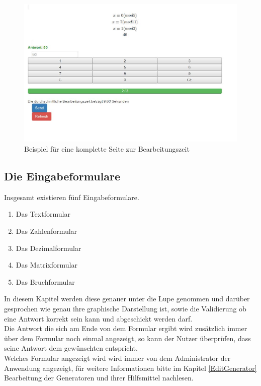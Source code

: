 \begin{figure}[htp]     %
\centering
\includegraphics[width=1\textwidth]{bilder/TotalClient} 
\caption[Beispiel für eine komplette Seite zur Bearbeitungszeit]{Beispiel für eine komplette Seite zur Bearbeitungszeit}
\end{figure} 


\subsection{Die Eingabeformulare}

Insgesamt existieren fünf Eingabeformulare.
\begin{enumerate}
\item Das Textformular
\item Das Zahlenformular
\item Das Dezimalformular
\item Das Matrixformular
\item Das Bruchformular
\end{enumerate}

In diesem Kapitel werden diese genauer unter die Lupe genommen und darüber gesprochen wie genau ihre graphische Darstellung ist, sowie die Validierung ob eine Antwort korrekt sein kann und abgeschickt werden darf. \\
Die Antwort die sich am Ende von dem Formular ergibt wird zusätzlich immer über dem Formular noch einmal angezeigt, so kann der Nutzer überprüfen, dass seine Antwort dem gewünschten entspricht. \\
Welches Formular angezeigt wird wird immer von dem Administrator der Anwendung angezeigt, für weitere Informationen bitte im Kapitel \ref{EditGenerator} Bearbeitung der Generatoren und ihrer Hilfsmittel nachlesen.


